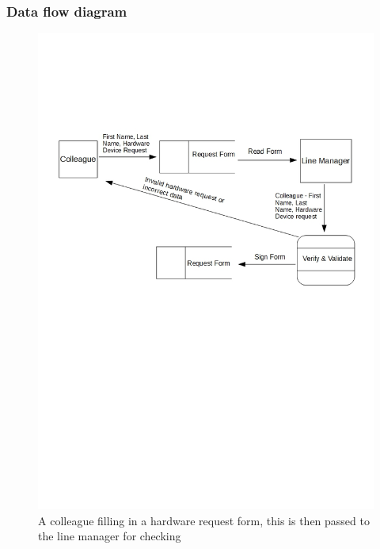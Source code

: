 \subsubsection{Data flow diagram}

\begin{figure}[H]
\includegraphics[width=\textwidth]{CurrentDFD.jpg}
\caption{A colleague filling in a hardware request form, this is then passed to the line manager for checking} \label{Page1Interview}
\end{figure}

